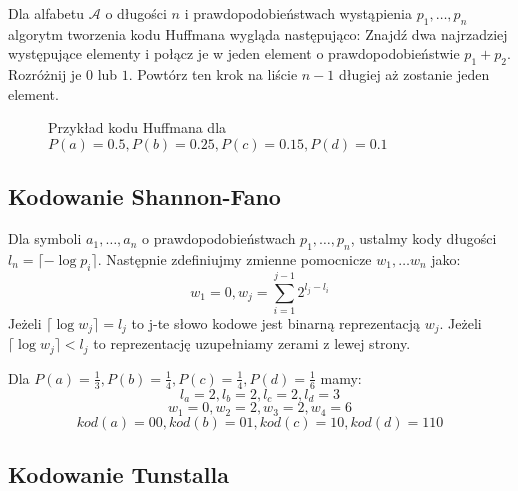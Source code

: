 \documentclass{../notatki}
\begin{document}
Dla alfabetu $\mathcal{A}$ o długości $n$ i prawdopodobieństwach
wystąpienia $p_1, \dots, p_n$ algorytm tworzenia kodu Huffmana wygląda
następująco:
Znajdź dwa najrzadziej występujące elementy i połącz je w jeden element
o prawdopodobieństwie $p_1 + p_2$. Rozróżnij je $0$ lub $1$. Powtórz
ten krok na liście $n-1$ długiej aż zostanie jeden element.

\begin{figure*}[h]
  \centering
  \caption{Przykład kodu Huffmana dla $P(a) = 0.5, P(b) = 0.25, P(c)
  = 0.15, P(d) = 0.1$}
\end{figure*}

\subsection{Kodowanie Shannon-Fano}

Dla symboli $a_1, \dots, a_n$ o prawdopodobieństwach $p_1, \dots, p_n$,
ustalmy kody długości $l_n = \lceil - \log p_i \rceil$. Następnie
zdefiniujmy zmienne pomocnicze $w_1, \dots w_n$ jako:
$$
w_1 = 0, w_j = \sum_{i=1}^{j-1}2^{l_j - l_i}
$$
Jeżeli $\lceil \log w_j \rceil = l_j$ to j-te słowo kodowe jest binarną
reprezentacją $w_j$. Jeżeli $\lceil \log w_j \rceil < l_j$ to reprezentację
uzupełniamy zerami z lewej strony.

Dla $P(a) = \frac{1}{3}, P(b) = \frac{1}{4}, P(c) = \frac{1}{4}, P(d)
= \frac{1}{6}$ mamy:
$$
l_a = 2, l_b = 2, l_c = 2, l_d = 3
$$
$$
w_1 = 0, w_2 = 2, w_3 = 2, w_4 = 6
$$
$$
kod(a) = 00, kod(b) = 01, kod(c) = 10, kod(d) = 110
$$

\subsection{Kodowanie Tunstalla}
\end{document}
